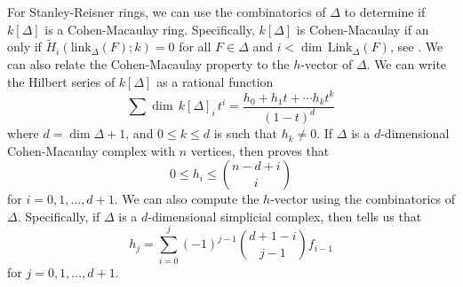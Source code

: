 \documentclass[12pt,leqno]{amsart}
\theoremstyle{definition}
\begin{document}

For Stanley-Reisner rings, we can use the combinatorics of $\Delta$ to determine if $k[\Delta]$ is a Cohen-Macaulay ring. Specifically, $k[\Delta]$ is Cohen-Macaulay if an only if $\widetilde H_i(\mathrm{link}_\Delta(F);k) = 0$ for all $F \in \Delta$ and $i < \dim \hspace{2pt} \mathrm{Link}_\Delta(F)$, see \cite[Corollary 5.3.9]{BH}. We can also relate the Cohen-Macaulay property to the $h$-vector of $\Delta$. We can write the Hilbert series of $k[\Delta]$ as a rational function
%
\begin{displaymath}
  \sum \dim \hspace{2pt} k[\Delta]_i \hspace{2pt} t^i = \frac {h_0 + h_1t + \cdots h_k t^k}{(1-t)^d}
\end{displaymath}
%
where $d = \dim \Delta + 1$, and $0 \leq k \leq d$ is such that $h_k \not = 0$. If $\Delta$ is a $d$-dimensional Cohen-Macaulay complex with $n$ vertices, then \cite[Lemma 5.1.10]{BH} proves that
%
\begin{displaymath}
  0 \leq h_i \leq \binom{n-d+i}{i}
\end{displaymath}
%
for $i = 0,1,...,d+1$. We can also compute the $h$-vector using the combinatorics of $\Delta$. Specifically, if $\Delta$ is a $d$-dimensional simplicial complex, then \cite[Lemma 5.18]{BH} tells us that
%
\begin{displaymath}
  h_j = \sum_{i=0}^j (-1)^{j-1} \binom{d+1-i}{j-1}f_{i-1}
\end{displaymath}
%
for $j = 0,1,...,d+1$.
%
\end{document}
